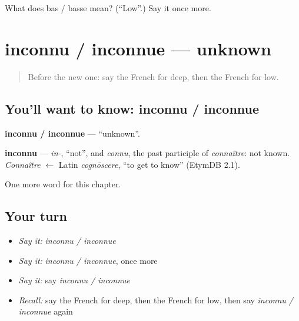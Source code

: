 \begin{tcolorbox}[breakable,colback=teal!4,colframe=teal!35!black,title={Before you move on}]
What does bas / basse mean? (\textquotedblleft{}Low\textquotedblright{}.) Say it once more.
\end{tcolorbox}
\section[inconnu / inconnue]{inconnu / inconnue — unknown}

\label{lesson:FR-C160-inconnu-inconnue}



\begin{quote}
Before the new one: say the French for deep, then the French for low.
\end{quote}

\subsection*{You'll want to know: inconnu / inconnue}
\textbf{inconnu / inconnue} — \textquotedblleft{}unknown\textquotedblright{}.

\begin{cousinweb}
\textbf{inconnu} — \emph{in-}, \textquotedblleft{}not\textquotedblright{}, and \emph{connu}, the past participle of \emph{connaître}: not known. \emph{Connaître} $\leftarrow$ Latin \emph{cognōscere}, \textquotedblleft{}to get to know\textquotedblright{} (EtymDB 2.1).
\end{cousinweb}

\begin{grammarlens}[title={What you've built}]
One more word for this chapter.
\end{grammarlens}

\subsection*{Your turn}
\begin{itemize}
\raggedright
  \item \emph{Say it:} \emph{inconnu / inconnue}
  \item \emph{Say it:} \emph{inconnu / inconnue}, once more
  \item \emph{Say it:} say \emph{inconnu / inconnue}
  \item \emph{Recall:} say the French for deep, then the French for low, then say \emph{inconnu / inconnue} again
\end{itemize}

